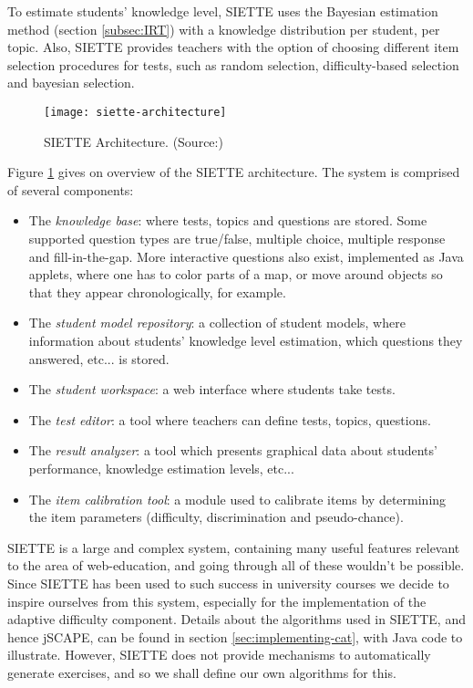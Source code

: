 To estimate students' knowledge level, SIETTE uses the Bayesian estimation method (section \ref{subsec:IRT}) with a knowledge distribution per student, per topic. Also, SIETTE provides teachers with the option of choosing different item selection procedures for tests, such as random selection, difficulty-based selection and bayesian selection.

\begin{figure}[H]
\centering
\texttt{[image: siette-architecture]}
\caption{SIETTE Architecture. (Source:\cite{SIETTE})}
\label{fig:siette-architecture}
\end{figure}

Figure \ref{fig:siette-architecture} gives on overview of the SIETTE architecture. The system is comprised of several components\cite{SIETTE-components}:
\begin{itemize}
\item The \textit{knowledge base}: where tests, topics and questions are stored. Some supported question types are true/false, multiple choice, multiple response and fill-in-the-gap. More interactive questions also exist, implemented as Java applets, where one has to color parts of a map, or move around objects so that they appear chronologically, for example.
\item The \textit{student model repository}: a collection of student models, where information about students' knowledge level estimation, which questions they answered, etc... is stored.
\item The \textit{student workspace}: a web interface where students take tests.
\item The \textit{test editor}: a tool where teachers can define tests, topics, questions.
\item The \textit{result analyzer}: a tool which presents graphical data about students' performance, knowledge estimation levels, etc...
\item The \textit{item calibration tool}: a module used to calibrate items by determining the item parameters (difficulty, discrimination and pseudo-chance).
\end{itemize}

SIETTE is a large and complex system, containing many useful features relevant to the area of web-education, and going through all of these wouldn't be possible. Since SIETTE has been used to such success in university courses we decide to inspire ourselves from this system, especially for the implementation of the adaptive difficulty component. Details about the algorithms used in SIETTE, and hence jSCAPE, can be found in section \ref{sec:implementing-cat}, with Java code to illustrate. However, SIETTE does not provide mechanisms to automatically generate exercises, and so we shall define our own algorithms for this.

